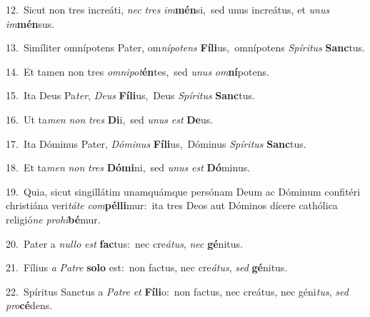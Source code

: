 {\numbfont\textcolor{\numbcolor}{12.}}~Sicut non tres increáti, \textit{nec} \textit{tres} \textit{im}\-\textbf{mén}si,~\star sed unus increátus, et \textit{u}\-\textit{nus} \textit{im}\-\textbf{mén}sus.\par
{\numbfont\textcolor{\numbcolor}{13.}}~Simíliter omnípotens Pater, om\-\textit{ní}\-\textit{pot}\textit{ens} \textbf{Fí}\-\textbf{li}us,~\star omnípotens \textit{Spí}\-\textit{ri}\textit{tus} \textbf{Sanc}\-tus.\par
{\numbfont\textcolor{\numbcolor}{14.}}~Et tamen non tres \textit{om}\-\textit{ni}\textit{pot}\textbf{én}tes,~\star sed \textit{u}\-\textit{nus} \textit{om}\-\textbf{ní}potens.\par
{\numbfont\textcolor{\numbcolor}{15.}}~Ita Deus Pa\-\textit{ter}\-, \textit{De}\-\textit{us} \textbf{Fí}\-\textbf{li}us,~\star Deus \textit{Spí}\-\textit{ri}\textit{tus} \textbf{Sanc}\-tus.\par
{\numbfont\textcolor{\numbcolor}{16.}}~Ut ta\textit{men} \textit{non} \textit{tres} \textbf{Di}\-i,~\star sed \textit{u}\-\textit{nus} \textit{est} \textbf{De}\-us.\par
{\numbfont\textcolor{\numbcolor}{17.}}~Ita Dóminus Pater, \textit{Dó}\-\textit{mi}\textit{nus} \textbf{Fí}\-\textbf{li}us,~\star Dóminus \textit{Spí}\-\textit{ri}\textit{tus} \textbf{Sanc}\-tus.\par
{\numbfont\textcolor{\numbcolor}{18.}}~Et ta\textit{men} \textit{non} \textit{tres} \textbf{Dó}\-\textbf{mi}ni,~\star sed \textit{u}\-\textit{nus} \textit{est} \textbf{Dó}\-minus.\par
{\numbfont\textcolor{\numbcolor}{19.}}~Quia, sicut singillátim unamquámque persónam Deum ac Dóminum confitéri christiána veri\-\textit{tá}\-\textit{te} \textit{com}\-\textbf{pél}\textbf{li}mur:~\star ita tres Deos aut Dóminos dícere cathólica religió\textit{ne} \textit{pro}\-\textit{hi}\textbf{bé}mur.\par
{\numbfont\textcolor{\numbcolor}{20.}}~Pater a \textit{nul}\-\textit{lo} \textit{est} \textbf{fac}\-tus:~\star nec cre\-\textit{á}\-\textit{tus}, \textit{nec} \textbf{gé}\-nitus.\par
{\numbfont\textcolor{\numbcolor}{21.}}~Fílius \textit{a} \textit{Pa}\-\textit{tre} \textbf{so}\-\textbf{lo} est:~\star non factus, nec cre\-\textit{á}\-\textit{tus}, \textit{sed} \textbf{gé}\-nitus.\par
{\numbfont\textcolor{\numbcolor}{22.}}~Spíritus Sanctus a \textit{Pa}\-\textit{tre} \textit{et} \textbf{Fí}\-\textbf{li}o:~\star non factus, nec creátus, nec géni\-\textit{tus}\-, \textit{sed} \textit{pro}\-\textbf{cé}dens.\par
